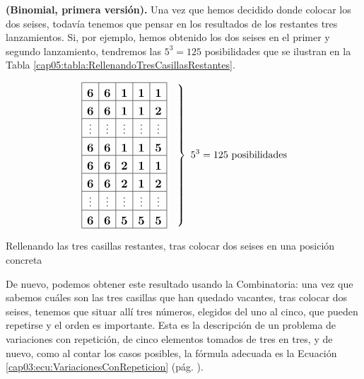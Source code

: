 \begin{Ejemplo}{\bf (Binomial, primera versión).}
    Una vez que hemos decidido donde colocar los dos seises, todavía tenemos que pensar en los resultados de los restantes tres lanzamientos. Si, por ejemplo, hemos obtenido los dos seises en el primer y segundo lanzamiento, tendremos las $5^3=125$ posibilidades que se ilustran en la Tabla \ref{cap05:tabla:RellenandoTresCasillasRestantes}.
        \begin{table}[ht]
        \begin{center}
        \[
        \left.\begin{array}{|c|c|c|c|c|}
        \hline
         \rule{0cm}{0.5cm}\mbox{\large\bf 6}&\mbox{\large\bf 6}&\mbox{\large\bf 1}&\mbox{\large\bf 1}&\mbox{\large\bf 1}\\
        \hline
        \rule{0cm}{0.5cm}\mbox{\large\bf 6}&\mbox{\large\bf 6}&\mbox{\large\bf 1}&\mbox{\large\bf 1}&\mbox{\large\bf 2}\\
        \hline
        \rule{0cm}{0.5cm}\vdots&\vdots&\vdots&\vdots&\vdots\\
        \hline
        \rule{0cm}{0.5cm}\mbox{\large\bf 6}&\mbox{\large\bf 6}&\mbox{\large\bf 1}&\mbox{\large\bf 1}&\mbox{\large\bf 5}\\
        \hline
        \rule{0cm}{0.5cm}\mbox{\large\bf 6}&\mbox{\large\bf 6}&\mbox{\large\bf 2}&\mbox{\large\bf 1}&\mbox{\large\bf 1}\\
        \hline
        \rule{0cm}{0.5cm}\mbox{\large\bf 6}&\mbox{\large\bf 6}&\mbox{\large\bf 2}&\mbox{\large\bf 1}&\mbox{\large\bf 2}\\
        \hline
        \rule{0cm}{0.5cm}\vdots&\vdots&\vdots&\vdots&\vdots\\
        \hline
        \rule{0cm}{0.5cm}\mbox{\large\bf 6}&\mbox{\large\bf 6}&\mbox{\large\bf 5}&\mbox{\large\bf 5}&\mbox{\large\bf 5}\\
        \hline
         \end{array}\quad\right\}\,\,5^3=125\mbox{ posibilidades}
         \]
        \caption{Rellenando las tres casillas restantes, tras colocar dos seises en una posición concreta}\label{cap05:tabla:RellenandoTresCasillasRestantes}
        \end{center}
        \end{table}
    De nuevo, podemos obtener este resultado usando la Combinatoria: una vez que sabemos cuáles son las tres casillas que han quedado vacantes, tras colocar dos seises, tenemos que situar allí tres números, elegidos del uno al cinco, que pueden repetirse y el orden es importante. Esta es la descripción de un problema de variaciones con repetición, de cinco elementos tomados de tres en tres, y de nuevo, como al contar los casos posibles, la fórmula adecuada es la Ecuación \ref{cap03:ecu:VariacionesConRepeticion} (pág. \pageref{cap03:ecu:VariacionesConRepeticion}).


\end{Ejemplo}
